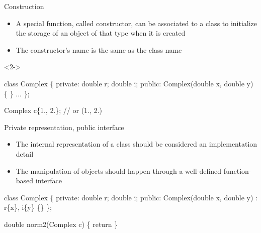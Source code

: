 \begin{frame}[fragile]{Construction}

  \begin{itemize}
  \item A special function, called \alert{constructor}, can be associated to a
    class to initialize the storage of an object of that type when it is created
  \item The constructor's name is the same as the class name
  \end{itemize}

  \begin{codeblock}<2->{
class \alert<2>{Complex} \{
 private:
  double r;
  double i;
 public:
  \alert<2>{Complex}(double x, double y)
  \{
  \}
  ...
\};

Complex c\{1., 2.\}; // or (1., 2.)}\end{codeblock}

\end{frame}

\begin{frame}[fragile]{Private representation, public interface \insertcontinuationtext}

  \begin{itemize}
  \item The internal representation of a class should be considered an
    implementation detail
  \item The manipulation of objects should happen through a
    well-defined function-based interface
  \end{itemize}

\begin{codeblock}
class Complex \{
 \alert<1>{private}:
  double r;
  double i;
 \alert<2>{public}:
  Complex(double x, double y) : r\{x\}, i\{y\} \{\}
\};

double norm2(Complex c) \{
  return 
\}\end{codeblock}

\end{frame}

